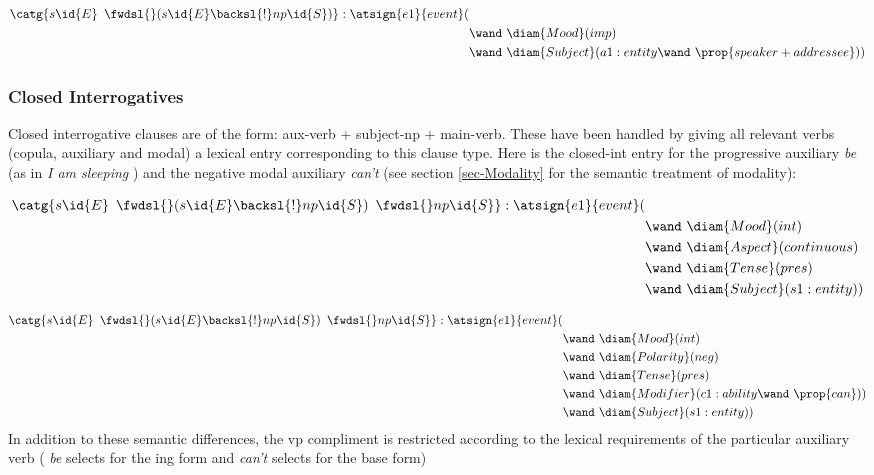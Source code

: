\begin{align*}
\catg{s\id{E} \enspace \fwdsl{} (s\id{E} \backsl{!}np\id{S} )} :  \atsign{e1}{event}(&   \\ 
      & \wand\ \diam{Mood}(imp) \\
      & \wand\ \diam{Subject}(a1:entity \wand\ \prop{speaker+addressee}  ) )
\end{align*}

\subsubsection{Closed Interrogatives}

Closed interrogative clauses are of the form:  aux-verb + subject-np + main-verb. These have been handled by giving all relevant verbs (copula,  auxiliary and modal) a lexical entry corresponding to this clause type. Here is the closed-int entry for the progressive auxiliary \emph{be} (as in \emph{I am sleeping} ) and the negative modal auxiliary \emph{can't} (see section \ref{sec-Modality} for the semantic treatment of modality):
\vspace{-1.5em} 

\begin{align*}
\catg{s\id{E} \enspace \fwdsl{} (s\id{E} \backsl{!}np\id{S} ) \enspace \fwdsl{} np\id{S} } :  \atsign{e1}{event}(&   \\ 
      & \wand\ \diam{Mood}(int) \\
      & \wand\ \diam{Aspect}(continuous) \\
      & \wand\ \diam{Tense}(pres) \\
      & \wand\ \diam{Subject}(s1:entity) )
\end{align*}

\begin{align*}
\catg{s\id{E} \enspace \fwdsl{} (s\id{E} \backsl{!}np\id{S} ) \enspace \fwdsl{} np\id{S} } :  \atsign{e1}{event}(&   \\ 
      & \wand\ \diam{Mood}(int) \\
      & \wand\ \diam{Polarity}(neg) \\
      & \wand\ \diam{Tense}(pres) \\
      & \wand\ \diam{Modifier}(c1:ability \wand\ \prop{can}) ) \\
      & \wand\ \diam{Subject}(s1:entity) )
\end{align*}
In addition to these semantic differences, the vp compliment is restricted according to the lexical requirements of the particular auxiliary verb ( \emph{be} selects for the ing form and \emph{can't} selects for the base form)


